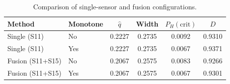 \begin{table}[t]
\centering
\caption{Comparison of single-sensor and fusion configurations.}
\label{tab:single_fusion_comparison}
\begin{tabular}{llcccc}
\toprule
Method & Monotone & $\hat{q}$ & Width & $P_H(\mathrm{crit})$ & $D$ \\
\midrule
Single (S11) & No & 0.2227 & 0.2735 & 0.0092 & 0.9310 \\
Single (S11) & Yes & 0.2227 & 0.2735 & 0.0067 & 0.9371 \\
Fusion (S11+S15) & No & 0.2067 & 0.2575 & 0.0083 & 0.9266 \\
Fusion (S11+S15) & Yes & 0.2067 & 0.2575 & 0.0067 & 0.9301 \\
\bottomrule
\end{tabular}
\end{table}
